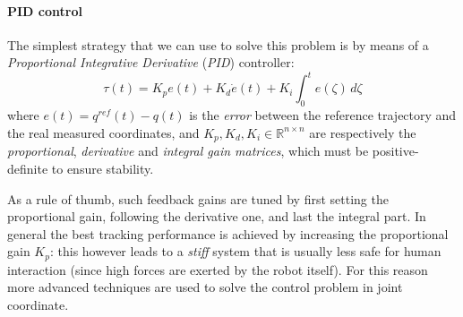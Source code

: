 	\paragraph{PID control} The simplest strategy that we can use to solve this problem is by means of a \textit{Proportional Integrative Derivative} (\textit{PID}) controller:
	\begin{equation} \label{eq:PIDforce}
		\tau(t) = K_p e(t) + K_d \dot e(t) + K_i\int_0^t e(\zeta)\, d\zeta
	\end{equation}
	where $e(t) = q^{ref}(t) - q(t)$ is the \textit{error} between the reference trajectory and the real measured coordinates, and $K_p,K_d,K_i \in \mathds R^{n\times n}$ are respectively the \textit{proportional}, \textit{derivative} and \textit{integral gain matrices}, which must be positive-definite to ensure stability.
	
	As a rule of thumb, such feedback gains are tuned by first setting the proportional gain, following the derivative one, and last the integral part. In general the best tracking performance is achieved by increasing the proportional gain $K_p$: this however leads to a \textit{stiff} system that is usually less safe for human interaction (since high forces are exerted by the robot itself). For this reason more advanced techniques are used to solve the control problem in joint coordinate.
		
